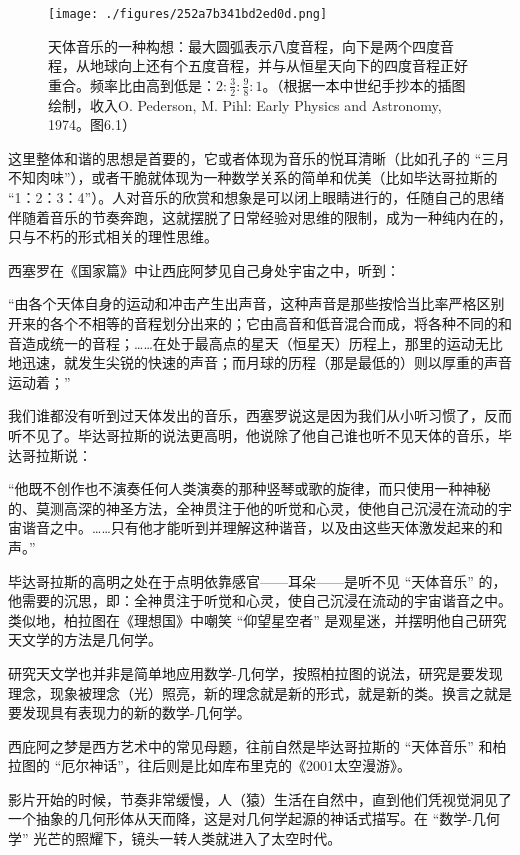 \begin{figure}[ht]
\centering
\texttt{[image: ./figures/252a7b341bd2ed0d.png]}
\caption{天体音乐的一种构想：最大圆弧表示八度音程，向下是两个四度音程，从地球向上还有个五度音程，并与从恒星天向下的四度音程正好重合。频率比由高到低是：$2: \frac{3}{2} : \frac{9}{8} : 1$。（根据一本中世纪手抄本的插图绘制，收入O. Pederson, M. Pihl: Early Physics and Astronomy, 1974。图6.1）} \label{fig_ClBohr_4}
\end{figure}

这里整体和谐的思想是首要的，它或者体现为音乐的悦耳清晰（比如孔子的 “三月不知肉味”），或者干脆就体现为一种数学关系的简单和优美（比如毕达哥拉斯的 “1：2：3：4”）。人对音乐的欣赏和想象是可以闭上眼睛进行的，任随自己的思绪伴随着音乐的节奏奔跑，这就摆脱了日常经验对思维的限制，成为一种纯内在的，只与不朽的形式相关的理性思维。

西塞罗在《国家篇》中让西庇阿梦见自己身处宇宙之中，听到：

“由各个天体自身的运动和冲击产生出声音，这种声音是那些按恰当比率严格区别开来的各个不相等的音程划分出来的；它由高音和低音混合而成，将各种不同的和音造成统一的音程；……在处于最高点的星天（恒星天）历程上，那里的运动无比地迅速，就发生尖锐的快速的声音；而月球的历程（那是最低的）则以厚重的声音运动着；”

我们谁都没有听到过天体发出的音乐，西塞罗说这是因为我们从小听习惯了，反而听不见了。毕达哥拉斯的说法更高明，他说除了他自己谁也听不见天体的音乐，毕达哥拉斯说：

“他既不创作也不演奏任何人类演奏的那种竖琴或歌的旋律，而只使用一种神秘的、莫测高深的神圣方法，全神贯注于他的听觉和心灵，使他自己沉浸在流动的宇宙谐音之中。……只有他才能听到并理解这种谐音，以及由这些天体激发起来的和声。”

毕达哥拉斯的高明之处在于点明依靠感官——耳朵——是听不见 “天体音乐” 的，他需要的沉思，即：全神贯注于听觉和心灵，使自己沉浸在流动的宇宙谐音之中。类似地，柏拉图在《理想国》中嘲笑 “仰望星空者” 是观星迷，并摆明他自己研究天文学的方法是几何学。

研究天文学也并非是简单地应用数学-几何学，按照柏拉图的说法，研究是要发现理念，现象被理念（光）照亮，新的理念就是新的形式，就是新的类。换言之就是要发现具有表现力的新的数学-几何学。

西庇阿之梦是西方艺术中的常见母题，往前自然是毕达哥拉斯的 “天体音乐” 和柏拉图的 “厄尔神话”，往后则是比如库布里克的《2001太空漫游》。

影片开始的时候，节奏非常缓慢，人（猿）生活在自然中，直到他们凭视觉洞见了一个抽象的几何形体从天而降，这是对几何学起源的神话式描写。在 “数学-几何学” 光芒的照耀下，镜头一转人类就进入了太空时代。

